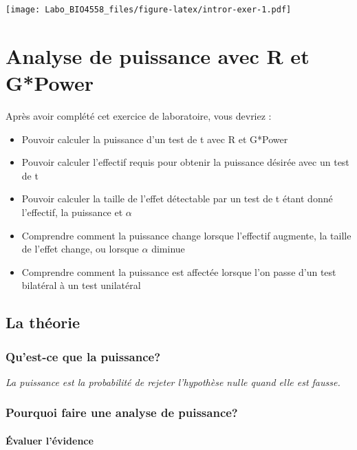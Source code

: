 \documentclass[12pt,]{book}
\providecommand{\tightlist}{%
  \setlength{\itemsep}{0pt}\setlength{\parskip}{0pt}}
\begin{document}
\texttt{[image: Labo\_BIO4558\_files/figure-latex/intror-exer-1.pdf]}

\hypertarget{analyse-de-puissance-avec-r-et-gpower}{%
\chapter{Analyse de puissance avec R et G*Power}\label{analyse-de-puissance-avec-r-et-gpower}}

Après avoir complété cet exercice de laboratoire, vous devriez :

\begin{itemize}
\tightlist
\item
  Pouvoir calculer la puissance d'un test de t avec R et G*Power
\item
  Pouvoir calculer l'effectif requis pour obtenir la puissance désirée avec un test de t
\item
  Pouvoir calculer la taille de l'effet détectable par un test de t étant donné l'effectif, la puissance et \(\alpha\)
\item
  Comprendre comment la puissance change lorsque l'effectif augmente, la taille de l'effet change, ou lorsque \(\alpha\) diminue
\item
  Comprendre comment la puissance est affectée lorsque l'on passe d'un test bilatéral à un test unilatéral
\end{itemize}

\hypertarget{la-thuxe9orie}{%
\section{La théorie}\label{la-thuxe9orie}}

\hypertarget{quest-ce-que-la-puissance}{%
\subsection{Qu'est-ce que la puissance?}\label{quest-ce-que-la-puissance}}

\emph{La puissance est la probabilité de rejeter l'hypothèse nulle quand elle est fausse.}

\hypertarget{pourquoi-faire-une-analyse-de-puissance}{%
\subsection{Pourquoi faire une analyse de puissance?}\label{pourquoi-faire-une-analyse-de-puissance}}

\hypertarget{uxe9valuer-luxe9vidence}{%
\subsubsection*{Évaluer l'évidence}\label{uxe9valuer-luxe9vidence}}
\end{document}

